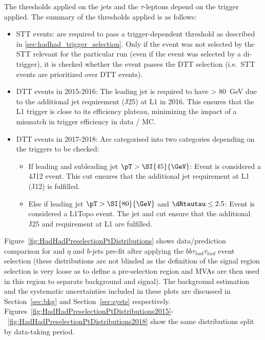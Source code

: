The \pt thresholds applied on the jets and the $\tau$-leptons depend on the trigger applied. The summary of the \pT thresholds applied is as follows:
\begin{itemize}
\item STT events: \tauhadvis are required to pass a trigger-dependent
  \pT threshold as described in
  \cref{sec:hadhad_trigger_selection}. Only if the event was not
  selected by the STT relevant for the particular run (even if the
  event was selected by a di-\tauhad trigger), it is checked whether
  the event passes the DTT selection (i.e.\ STT events are prioritized
  over DTT events).

\item DTT events in 2015-2016: The leading jet is required to have \pT >
  \SI{80}{\GeV} due to the additional jet requirement (J25) at L1 in 2016. This
  ensures that the L1 trigger is close to its efficiency plateau, minimizing the
  impact of a mismatch in trigger efficiency in data / MC.

\item DTT events in 2017-2018: Are categorised into two categories depending on
  the triggers to be checked: %
  \begin{itemize}
  \item If leading and subleading jet $\pT > \SI{45}{\GeV}$: Event is considered a
    4J12 event. This cut ensures that the additional jet requirement at L1 (J12)
    is fulfilled.
  \item Else if leading jet $\pT > \SI{80}{\GeV}$ and $\dRtautau \leq 2.5$:
    Event is considered a L1Topo event. The jet \pT and \dRtautau cut ensure
    that the additional J25 and \dRtautau requirement at L1 are fulfilled.
  \end{itemize}
\end{itemize}

Figure~\ref{fig:HadHadPreselectionPtDistributions} shows data/prediction comparison for \tauhad \pt and $\eta$ and $b$-jets \pt pre-fit after applying the $bb\tau_{had}\tau_{had}$ event selection (these distributions are not blinded as the definition of the signal region selection is very loose as to define a pre-selection region and MVAs are then used in this region to separate background and signal). The background estimation and the systematic uncertainties included in these plots are discussed in Section~\ref{sec:bkg} and Section~\ref{sec:systs} respectively. Figures~\ref{fig:HadHadPreselectionPtDistributions2015}-~\ref{fig:HadHadPreselectionPtDistributions2018} show the same distributions split by data-taking period.

